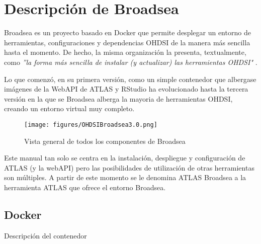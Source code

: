 \chapter{Descripción de Broadsea}



Broadsea es un proyecto basado en Docker que permite desplegar un entorno de herramientas, configuraciones y dependencias OHDSI de la manera más sencilla hasta el momento. De hecho, la misma organización la presenta, textualmente, como \textit{''la forma más sencilla de instalar (y actualizar) las herramientas OHDSI"} \cite{Broadsea3PDF}.

Lo que comenzó, en su primera versión, como un simple contenedor que albergase imágenes de la WebAPI de ATLAS y RStudio ha evolucionado hasta la tercera versión en la que se Broadsea alberga la mayoria de herramientas OHDSI, creando un entorno virtual muy completo.

\begin{figure}[H]
    \centering
    \texttt{[image: figures/OHDSIBroadsea3.0.png]}
    \caption{Vista general de todos los componentes de Broadsea \cite{Broadsea3PPTX}}
    \label{fig:enter-label}
\end{figure}

Este manual tan solo se centra en la instalación, despliegue y configuración de ATLAS (y la webAPI) pero las posibilidades de utilización de otras herramientas son múltiples. A partir de este momento se le denomina ATLAS Broadsea a la herramienta ATLAS que ofrece el entorno Broadsea.

\section{Docker}

Descripción del contenedor

